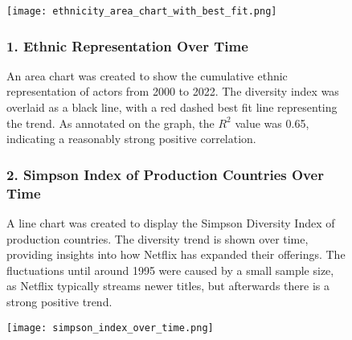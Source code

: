 \documentclass{article}
\begin{document}
\begin{figure}[h!]
    \centering
    \begin{minipage}[t]{0.65\textwidth}
        \vspace{0pt} %
        \texttt{[image: ethnicity\_area\_chart\_with\_best\_fit.png]}
        \label{fig:ethnicity-area-chart}
    \end{minipage}%
    \hspace{0.6cm} %
    \begin{minipage}[t]{0.3\textwidth}
        \subsubsection*{1. Ethnic Representation Over Time}

        An area chart was created to show the cumulative ethnic representation of actors from 2000 to 2022.\newline
        The diversity index was overlaid as a black line, with a red dashed best fit line representing the trend. As annotated on the graph, the \(R^2\) value was 0.65, indicating a reasonably strong positive correlation.
    \end{minipage}
\end{figure}


\begin{figure}[h!]
    \centering
    \begin{minipage}[t]{0.3\textwidth}
        \subsubsection*{2. Simpson Index of Production Countries Over Time}

        A line chart was created to display the Simpson Diversity Index of production countries. \newline
        The diversity trend is shown over time, providing insights into how Netflix has expanded their offerings. The fluctuations until around 1995 were caused by a small sample size, as Netflix typically streams newer titles, but afterwards there is a strong positive trend. 
    \end{minipage}
    \hspace{0.6cm} %
    \begin{minipage}[t]{0.65\textwidth}
        \vspace{0pt} %
        \texttt{[image: simpson\_index\_over\_time.png]}
        \label{fig:simpson-index-over-time}
    \end{minipage}%
    
\end{figure}
\end{document}
